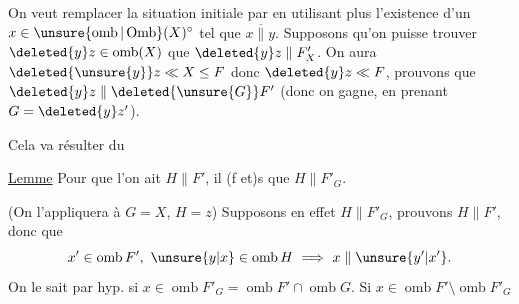 On veut remplacer la situation initiale par
en utilisant   plus l'existence d'un $x\in\unsure{\operatorname{omb}|\operatorname{Omb}}(X)^\circ$ tel que $x\mathrel{\overline{\parallel}}y$. Supposons qu'on puisse trouver $\deleted{y}z\in\operatorname{omb}(X)$  que $\deleted{y}z\parallel F'_X$. On aura $\deleted{\unsure{y}}z\ll X\leq F$ donc $\deleted{y}z\ll F$, prouvons que $\deleted{y}z\parallel\deleted{\unsure{G}}F'$ (donc on gagne, en prenant $G=\deleted{y}z'$).

 Cela va résulter du

\uline{Lemme} \quad {}
Pour que  l'on ait $H\parallel F'$, il (f et)s que $H\parallel F'_G$.

(On l'appliquera à $G=X$, $H=z$) Supposons en effet $H\parallel F'_G$, prouvons $H\parallel F'$, donc que 
\[
x'\in\operatorname{omb} F',\ \unsure{y|x}\in\operatorname{omb} H\ \Longrightarrow\ x\parallel \unsure{y'|x'}.
\]
On le sait par hyp. si $x\in\operatorname{omb} F'_G=\operatorname{omb} F'\cap\operatorname{omb} G$. Si $x\in\operatorname{omb} F'\setminus\operatorname{omb} F'_G$
